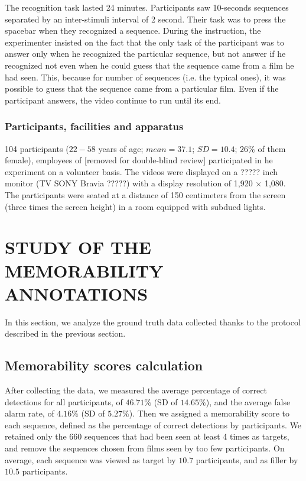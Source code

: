 \documentclass[sigconf]{acmart}
\begin{document}
The recognition task lasted 24 minutes. Participants saw 10-seconds sequences separated by an inter-stimuli interval of 2 second. Their task was to press the spacebar when they recognized a sequence.
During the instruction, the experimenter insisted on the fact that the only task of the participant was to answer only when he recognized the particular sequence, but not answer if he recognized not even when he could guess that the sequence came from a film he had seen. This, because for number of sequences (i.e. the typical ones), it was possible to guess that the sequence came from a particular film.
Even if the participant answers, the video continue to run until its end.


\subsubsection{Participants, facilities and apparatus}
104 participants ($22-58$ years of age; $mean = 37.1 $; $SD = 10.4 $; $26\%$ of them female), employees of [removed for double-blind review] participated in he experiment on a volunteer basis. %
The videos were displayed on a ????? inch monitor (TV SONY Bravia ?????) with a display resolution of 1,920 $\times$ 1,080. The participants were seated at a distance of 150 centimeters from the screen (three times the screen height) in a room equipped with subdued lights.

\section{STUDY OF THE MEMORABILITY ANNOTATIONS}
In this section, we analyze the ground truth data collected thanks to the protocol described in the previous section.
\subsection{Memorability scores calculation}
After collecting the data, we measured the average percentage of correct detections for all participants, of $46.71\%$ (SD of $14.65\%$), and the average false alarm rate, of $4.16\%$ (SD of $5.27\%$).
Then we assigned a memorability score to each sequence, defined as the percentage of correct detections by participants.
We retained only the 660 sequences that had been seen at least 4 times as targets, and remove the sequences chosen from films seen by too few participants.
On average, each sequence was viewed as target by $10.7$ participants, and as filler by $10.5$ participants.
\end{document}
